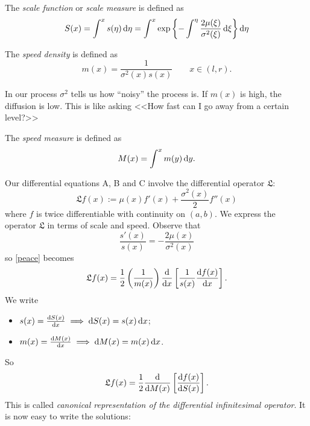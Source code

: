 \documentclass[12pt]{report}
\begin{document}
\begin{definition}
	The \emph{scale function} or \emph{scale measure} is defined as
	\begin{equation*}
		S(x)=\int^{x}s(\eta)\mathop{}\!\mathrm{d}\eta=\int^{x}\exp\left\{-\int^{\eta}\frac{2\mu(\xi)}{\sigma^{2}(\xi)}\mathop{}\!\mathrm{d}\xi\right\}\mathop{}\!\mathrm{d}\eta
	\end{equation*}
\end{definition}
\begin{definition}
	The \emph{speed density} is defined as
	\begin{equation*}
		m(x)=\frac{1}{\sigma^{2}(x)s(x)}\qquad x\in(l,r).
	\end{equation*}
\end{definition}
In our process $\sigma^{2}$ tells us how ``noisy'' the process is. If $m(x)$ is high, the diffusion is low. This is like asking <<How fast can I go away from a certain level?>>
\begin{definition}
	The \emph{speed measure} is defined as
	\begin{equation*}
		M(x)=\int^{x}m(y)\mathop{}\!\mathrm{d} y.
	\end{equation*}
\end{definition}
Our differential equations A, B and C involve the differential operator $\mathfrak{L}$:
\begin{equation*}
	\mathfrak{L}f(x):=\mu(x)f'(x)+\frac{\sigma^{2}(x)}{2}f''(x)\tag*{\faHandPeace}\label{peace}
\end{equation*}
where $f$ is twice differentiable with continuity on $(a,b)$. We express the operator $\mathfrak{L}$ in terms of scale and speed. Observe that
\begin{equation*}
	\frac{s'(x)}{s(x)}=-\frac{2\mu(x)}{\sigma^{2}(x)}
\end{equation*}
so \ref{peace} becomes
\begin{equation*}
	\mathfrak{L}f(x)=\frac{1}{2}\left(\frac{1}{m(x)}\right)\frac{\mathop{}\!\mathrm{d}}{\mathop{}\!\mathrm{d} x}\left[\frac{1}{s(x)}\frac{\mathop{}\!\mathrm{d} f(x)}{\mathop{}\!\mathrm{d} x}\right].
\end{equation*}
We write
\begin{itemize}
	\item $s(x)=\frac{\mathop{}\!\mathrm{d} S(x)}{\mathop{}\!\mathrm{d} x}\implies\mathop{}\!\mathrm{d} S(x)=s(x)\mathop{}\!\mathrm{d} x$;
	\item $m(x)=\frac{\mathop{}\!\mathrm{d} M(x)}{\mathop{}\!\mathrm{d} x}\implies\mathop{}\!\mathrm{d} M(x)=m(x)\mathop{}\!\mathrm{d} x$.
\end{itemize}
So
\begin{equation*}
	\mathfrak{L}f(x)=\frac{1}{2}\frac{\mathop{}\!\mathrm{d}}{\mathop{}\!\mathrm{d} M(x)}\left[\frac{\mathop{}\!\mathrm{d} f(x)}{\mathop{}\!\mathrm{d} S(x)}\right].
\end{equation*}
This is called \emph{canonical representation of the differential infinitesimal operator}. It is now easy to write the solutions:
\end{document}
